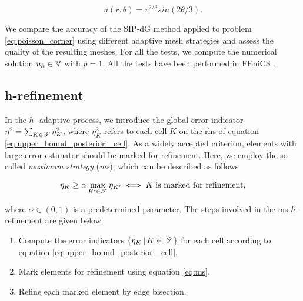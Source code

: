 \documentclass[a4paper,11pt]{article}
\begin{document}
{\begin{equation}
    u(r,\theta) = r^{2/3} sin(2\theta/3).
\label{eq:exact_solution_laplace}
\end{equation}

We compare the accuracy of the SIP-dG method applied to problem \eqref{eq:poisson_corner} using different adaptive mesh strategies and assess the quality of the resulting meshes. For all the tests, we compute the numerical solution $u_{h} \in \mathbb V$ with $p=1$. All the tests have been performed in FEniCS \cite{Logg:2010}.

\subsection{h-refinement}

In the $h$- adaptive process, we introduce the global error indicator $\eta^{2} = \sum_{K \in \mathscr T^{}} \eta_{K}^{2}$, where $\eta_{K}^{2}$ refers to each cell $K$ on the rhs of equation \eqref{eq:upper_bound_posteriori_cell}. As a widely accepted criterion, elements with large error estimator should be marked for refinement. Here, we employ the so called \textit{maximum strategy} (\textit{ms}), which can be described as follows

\begin{equation}
    \eta_{K} \geq \alpha \max_{K' \in \mathscr T^{}} \eta_{K'} \iff K \; \text{is marked for refinement},
\label{eq:ms}
\end{equation}

where $\alpha \in (0,1)$ is a predetermined parameter. The steps involved in the ms $h$-refinement are given below:

\begin{enumerate}
    \item Compute the error indicators $\{ \eta_{K} \, | \, K \in \mathscr T^{}  \}$ for each cell according to equation \eqref{eq:upper_bound_posteriori_cell}.

    \item Mark elements for refinement using equation \eqref{eq:ms}.
    
    \item Refine each marked element by edge bisection.
    
\end{enumerate}

}
\end{document}
